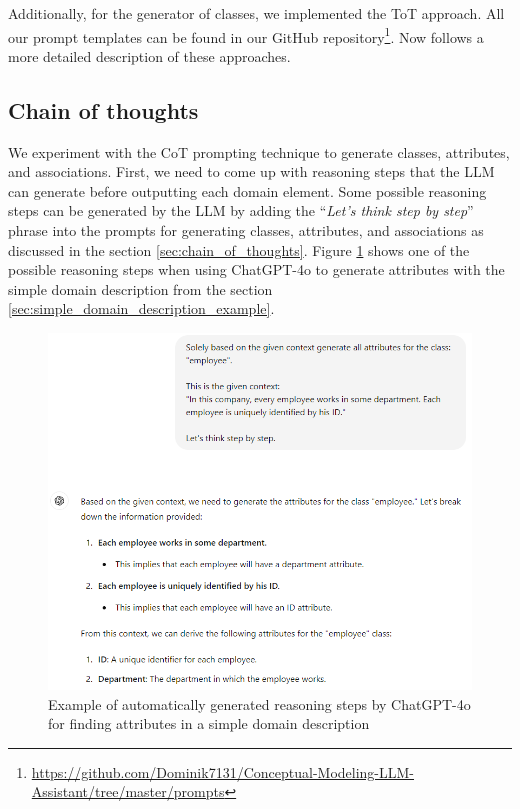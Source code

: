 \noindent{}Additionally, for the generator of classes, we implemented the ToT approach. All our prompt templates can be found in our GitHub repository\footnote{\url{https://github.com/Dominik7131/Conceptual-Modeling-LLM-Assistant/tree/master/prompts}}. Now follows a more detailed description of these approaches.



\subsection{Chain of thoughts}

We experiment with the CoT prompting technique to generate classes, attributes, and associations. First, we need to come up with reasoning steps that the LLM can generate before outputting each domain element. Some possible reasoning steps can be generated by the LLM by adding the ``\textit{Let's think step by step}'' phrase into the prompts for generating classes, attributes, and associations as discussed in the section \ref{sec:chain_of_thoughts}. Figure \ref{fig:cot-think-step-by-step} shows one of the possible reasoning steps when using ChatGPT-4o to generate attributes with the simple domain description from the section \ref{sec:simple_domain_description_example}.

\begin{figure}[!h]
    \centering
    \includegraphics[scale=0.6]{img/cot-think-step-by-step.png}
    \caption{\centering Example of automatically generated reasoning steps by ChatGPT-4o for finding attributes in a simple domain description}
    \label{fig:cot-think-step-by-step}
\end{figure}

